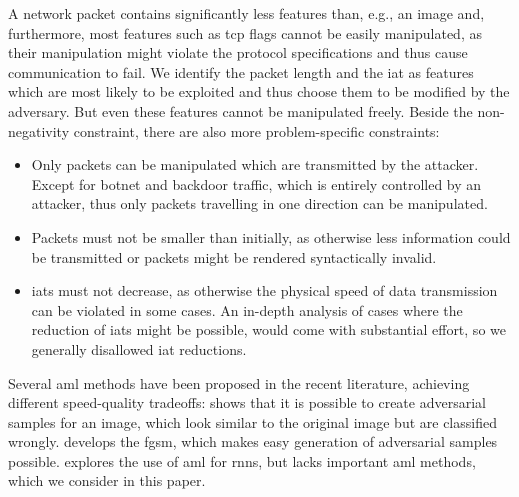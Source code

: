 \documentclass[conference]{IEEEtran}
\begin{document}
A network packet contains significantly less features than, e.g., an image and, furthermore, most features such as \gls{tcp} flags cannot be easily manipulated, as their manipulation might violate the protocol specifications and thus cause communication to fail. We identify the packet length and the \gls{iat} as features which are most likely to be exploited and thus choose them to be modified by the adversary. But even these features cannot be manipulated freely. Beside the non-negativity constraint,  there are also more problem-specific constraints:
\begin{itemize}[topsep=0pt,wide,labelwidth=!,labelindent=0pt]
\item Only packets can be manipulated which are transmitted by the attacker.
Except for botnet and backdoor traffic, which is entirely controlled by an attacker, thus only packets travelling in one direction can be manipulated.
\item Packets must not be smaller than initially, as otherwise less information could be transmitted or packets might be rendered syntactically invalid.
\item \glspl{iat} must not decrease, as otherwise the physical speed of data transmission can be violated in some cases. An in-depth analysis of cases where the reduction of \glspl{iat} might be possible, would come with substantial effort, so we generally disallowed \gls{iat} reductions.
\end{itemize}

Several \gls{aml} methods have been proposed in the recent literature, achieving different speed-quality tradeoffs:
\cite{szegedy_intriguing_2014} shows that it is possible to create adversarial samples for an image, which look similar to the original image but are classified wrongly. \cite{goodfellow_explaining_2015} develops the \gls{fgsm}, which makes easy generation of adversarial samples possible. \cite{papernot_crafting_2016} explores the use of \gls{aml} for \glspl{rnn}, but lacks important \gls{aml} methods, which we consider in this paper.

\end{document}
